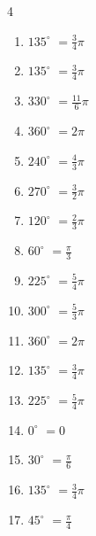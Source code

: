\begin{multicols}{4}
\begin{enumerate}
  \item $\displaystyle 135^{\circ}$
        $\displaystyle =\frac{3}{4}\pi$

  \item $\displaystyle 135^{\circ}$
        $\displaystyle =\frac{3}{4}\pi$

  \item $\displaystyle 330^{\circ}$
        $\displaystyle =\frac{11}{6}\pi$

  \item $\displaystyle 360^{\circ}$
        $\displaystyle =2\pi$

  \item $\displaystyle 240^{\circ}$
        $\displaystyle =\frac{4}{3}\pi$

  \item $\displaystyle 270^{\circ}$
        $\displaystyle =\frac{3}{2}\pi$

  \item $\displaystyle 120^{\circ}$
        $\displaystyle =\frac{2}{3}\pi$

  \item $\displaystyle 60^{\circ}$
        $\displaystyle =\frac{\pi}{3}$

\columnbreak %

  \item $\displaystyle 225^{\circ}$
        $\displaystyle =\frac{5}{4}\pi$

  \item $\displaystyle 300^{\circ}$
        $\displaystyle =\frac{5}{3}\pi$

  \item $\displaystyle 360^{\circ}$
        $\displaystyle =2\pi$

  \item $\displaystyle 135^{\circ}$
        $\displaystyle =\frac{3}{4}\pi$

  \item $\displaystyle 225^{\circ}$
        $\displaystyle =\frac{5}{4}\pi$

  \item $\displaystyle 0^{\circ}$
        $\displaystyle =0$

  \item $\displaystyle 30^{\circ}$
        $\displaystyle =\frac{\pi}{6}$

  \item $\displaystyle 135^{\circ}$
        $\displaystyle =\frac{3}{4}\pi$

  \item $\displaystyle 45^{\circ}$
        $\displaystyle =\frac{\pi}{4}$


\end{enumerate}
\end{multicols}
